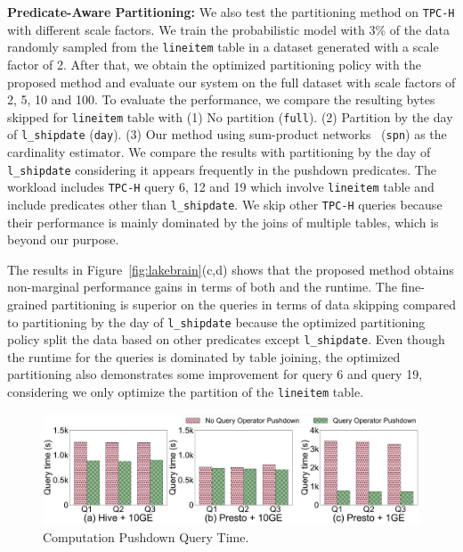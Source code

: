 \noindent \textbf{Predicate-Aware Partitioning:} We also test the partitioning method on \texttt{TPC-H}  with different scale factors. We train the probabilistic model with 3\% of the data randomly sampled from the \texttt{lineitem} table in a dataset generated with a scale factor of 2. After that, we obtain the optimized partitioning policy with the proposed method and evaluate our system on the full dataset with scale factors of 2, 5, 10 and 100. To evaluate the performance, we compare the resulting bytes skipped for \texttt{lineitem} table with (1) No partition (\texttt{full}). (2) Partition by the day of \texttt{l\_shipdate} (\texttt{day}).  (3) Our  method using sum-product networks~\cite{}  (\texttt{spn}) as the cardinality estimator.
 We compare the results with partitioning by the day of \texttt{l\_shipdate} considering it appears frequently in the pushdown predicates. The workload includes \texttt{TPC-H} query 6, 12 and 19 which involve \texttt{lineitem} table and include predicates other than \texttt{l\_shipdate}. We skip other \texttt{TPC-H} queries because their performance is  mainly dominated by the joins of multiple tables, which is beyond our purpose.
 

The results  in Figure~\ref{fig:lakebrain}(c,d) shows that the proposed method obtains non-marginal performance gains in terms of both  and the runtime. The fine-grained partitioning is superior on the queries in terms of data skipping compared to partitioning by the day of \texttt{l\_shipdate} because the optimized partitioning policy split the data based on other predicates except \texttt{l\_shipdate}. Even though the runtime for the queries is dominated by table joining, the optimized partitioning also demonstrates some improvement for query 6 and query 19, considering we only optimize the partition of the \texttt{lineitem} table. 





\begin{figure}
	\centering
	\includegraphics[width=\columnwidth]{figures/Querytime}
	\caption{Computation Pushdown Query Time.}
	\label{fig:pushdown}
\end{figure}


